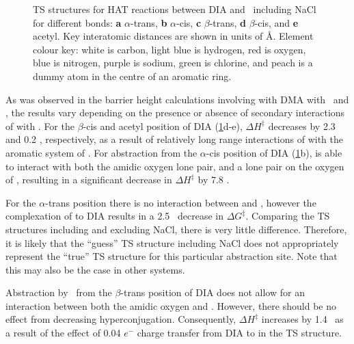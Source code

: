 \begin{figure}\ContinuedFloat
  \setcounter{subfigure}{4}

  \caption[TS structures for HAT reaction between DIA and \cumo\ including
  NaCl.]{TS structures for HAT reactions between DIA and \cumo\ including NaCl
  for different  bonds: \textbf{a} $\alpha$-trans, \textbf{b}
  $\alpha$-cis, \textbf{c} $\beta$-trans, \textbf{d} $\beta$-cis, and
  \textbf{e} acetyl. Key interatomic distances are shown in units of \AA.
  Element colour key: white is carbon, light blue is hydrogen, red is oxygen,
  blue is nitrogen, purple is sodium, green is chlorine, and peach is a dummy
  atom in the centre of an aromatic ring.}
  \label{fig:dia-cumo-ts}
\end{figure}

As was observed in the barrier height calculations involving  with DMA
with \bno\ and \cumo, the results vary depending on the presence or absence of
secondary interactions of  with \cumo. For the $\beta$-cis and acetyl
position of DIA (\ref{fig:dia-cumo-ts}d-e), $\Delta H^\ddagger$ decreases by 2.3
and 0.2 \kcalmol, respectively, as a result of relatively long range
interactions of  with the aromatic system of \cumo. For abstraction from
the $\alpha$-cis position of DIA (\ref{fig:dia-cumo-ts}b),  is able to
interact with both the amidic oxygen lone pair, and a lone pair on the oxygen of
\cumo, resulting in a significant decrease in $\Delta H^\ddagger$ by 7.8
\kcalmol.

For the $\alpha$-trans position there is no interaction between  and
\cumo, however the complexation of  to DIA results in a 2.5 \kcalmol\
decrease in $\Delta G^\ddagger$. Comparing the TS structures including and
excluding NaCl, there is very little difference. Therefore, it is likely that
the ``guess'' TS structure including NaCl does not appropriately represent the
``true'' TS structure for this particular abstraction site. Note that this may
also be the case in other systems.

Abstraction by \cumo\ from the $\beta$-trans position of DIA does not allow for
an interaction between both the amidic oxygen and \cumo. However, there should
be no effect from decreasing hyperconjugation. Consequently, $\Delta H^\ddagger$
increases by 1.4 \kcalmol\ as a result of the effect of 0.04 $e^-$ charge
transfer from DIA to \ch{Na} in the TS structure.


